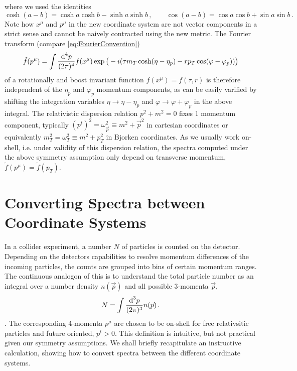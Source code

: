 where we used the identities
\begin{equation}
    \cosh(a-b)=\cosh a\cosh b-\sinh a\sinh b\,,\qquad\cos(a-b)=\cos a\cos b+\sin a\sin b\,.
\end{equation}
Note how $x^\mu$ and $p^\mu$ in the new coordinate system are not vector components in a strict sense and cannot be naively contracted using the new metric. The Fourier transform (compare \eqref{eq:FourierConvention})
\begin{equation}
    \tilde{f}(p^\mu)=\int\frac{\text{d}^4p}{(2\pi)^4}f(x^\mu)\exp\big(-{i}(\tau m_T\cosh(\eta-\eta_p)-rp_T\cos(\varphi-\varphi_p))\big)
\end{equation}
of a rotationally and boost invariant function ${f(x^\mu)=f(\tau,r)}$ is therefore independent of the $\eta_p$ and $\varphi_p$ momentum components, as can be easily varified by shifting the integration variables ${\eta\to\eta-\eta_p}$ and ${\varphi\to\varphi+\varphi_p}$ in the above integral. The relativistic dispersion relation ${p^2+m^2=0}$ fixes 1 momentum component, typically ${(p^t)^2=\omega_{\vec{p}}^2\equiv m^2+\vec{p}^2}$ in cartesian coordinates or equivalently ${m_T^2=\omega_T^2\equiv m^2+p_T^2}$ in Bjorken coordinates. As we usually work on-shell, i.e. under validity of this dispersion relation, the spectra computed under the above symmetry assumption only depend on transverse momentum, ${\tilde{f}(p^\mu)=\tilde{f}(p_T)}$.



\section{Converting Spectra between Coordinate Systems}
\label{sec:SpectraCoordinateSystem}

In a collider experiment, a number $N$ of particles is counted on the detector. Depending on the detectors capabilities to resolve momentum differences of the incoming particles, the counts are grouped into bins of certain momentum ranges. The continuous analogon of this is to understand the total particle number as an integral over a number density $n(\vec{p})$ and all possible 3-momenta $\vec{p}$,
\begin{equation}
    N=\int\frac{\text{d}^3p}{(2\pi)^3}n(\vec{p})\,.
    \label{eq:NumberDensity_Cartesian}
\end{equation}.
The corresponding 4-momenta $p^\mu$ are chosen to be on-shell for free relativsitic particles and future oriented, $p^t>0$. This definition is intuitive, but not practical given our symmetry assumptions. We shall briefly recapitulate an instructive calculation, showing how to convert spectra between the different coordinate systems.

